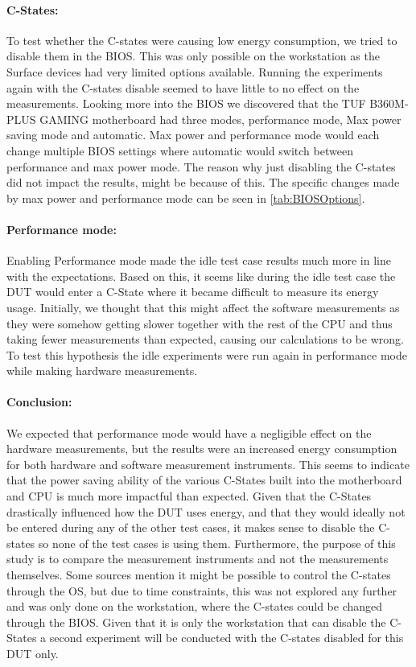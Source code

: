 \paragraph{C-States:} To test whether the C-states were causing low energy consumption, we tried to disable them in the BIOS. This was only possible on the workstation as the Surface devices had very limited options available. Running the experiments again with the C-states disable seemed to have little to no effect on the measurements. Looking more into the BIOS we discovered that the TUF B360M-PLUS GAMING motherboard had three modes, performance mode, Max power saving mode and automatic. Max power and performance mode would each change multiple BIOS settings where automatic would switch between performance and max power mode. The reason why just disabling the C-states did not impact the results, might be because of this. The specific changes made by max power and performance mode can be seen in \cref{tab:BIOSOptions}.



\paragraph{Performance mode:} Enabling Performance mode made the idle test case results much more in line with the expectations. Based on this, it seems like during the idle test case the DUT would enter a C-State where it became difficult to measure its energy usage. Initially, we thought that this might affect the software measurements as they were somehow getting slower together with the rest of the CPU and thus taking fewer measurements than expected, causing our calculations to be wrong. To test this hypothesis the idle experiments were run again in performance mode while making hardware measurements. 

\paragraph{Conclusion:} We expected that performance mode would have a negligible effect on the hardware measurements, but the results were an increased energy consumption for both hardware and software measurement instruments. This seems to indicate that the power saving ability of the various C-States built into the motherboard and CPU is much more impactful than expected. Given that the C-States drastically influenced how the DUT uses energy, and that they would ideally not be entered during any of the other test cases, it makes sense to disable the C-states so none of the test cases is using them. Furthermore, the purpose of this study is to compare the measurement instruments and not the measurements themselves. Some sources mention it might be possible to control the C-states through the OS\cite{CMete,CLinux}, but due to time constraints, this was not explored any further and was only done on the workstation, where the C-states could be changed through the BIOS. Given that it is only the workstation that can disable the C-States a second experiment will be conducted with the C-states disabled for this DUT only.